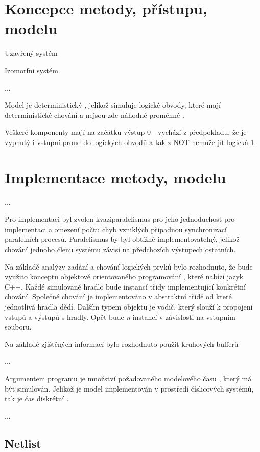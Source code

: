 \documentclass[11pt,a4paper]{article}
\begin{document}
	\section{Koncepce metody, přístupu, modelu}

		Uzavřený systém 
		
		Izomorfní systém 
	
		...	
		
		Model je deterministický , jelikož simuluje logické obvody, které mají deterministické chování a nejsou zde náhodné proměnné .
		
		Veškeré komponenty mají na začátku výstup 0 - vychází z předpokladu, že je vypnutý i vstupní proud do logických obvodů a tak z NOT nemůže jít logická 1.
	
	\section{Implementace metody, modelu}
		...
		
		Pro implementaci byl zvolen kvaziparalelismus  pro jeho jednoduchost pro implementaci a omezení počtu chyb vzniklých případnou synchronizací paralelních procesů. Paralelismus by byl obtížně implementovatelný, jelikož chování jednoho členu systému závisí na předchozích výstupech ostatních.
		
		Na základě analýzy zadání a chování logických prvků bylo rozhodnuto, že bude využito konceptu objektově orientovaného programování , které nabízí jazyk C++. Každé simulované hradlo bude instancí třídy implementující konkrétní chování. Společné chování je implementováno v abstraktní třídě od které jednotlivá hradla dědí. Dalším typem objektu je vodič, který slouží k propojení vstupů a výstupů s hradly. Opět bude \textit{n} instancí v závislosti na vstupním souboru.
		
		Na základě zjištěných informací bylo rozhodnuto použít kruhových bufferů
		
		...
		
		Argumentem programu je množství požadovaného modelového času , který má být simulován. Jelikož je model implementován v prostředí číslicových systémů, tak je čas diskrétní .
		
		...		
		
		
		\subsection{Netlist}
			\label{netlist}
\end{document}
